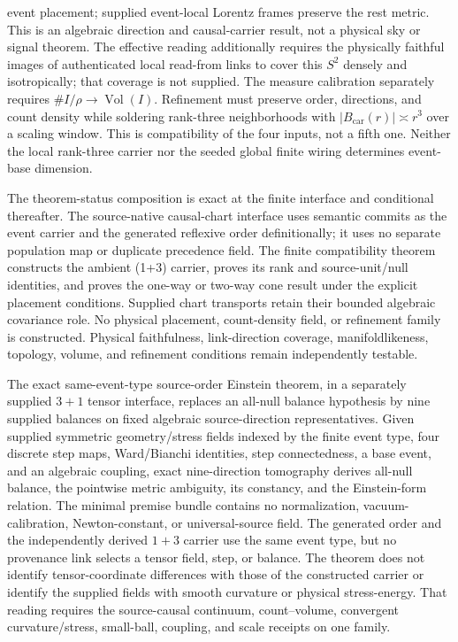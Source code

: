 event placement;
supplied event-local Lorentz frames preserve the rest metric. This is an
algebraic direction and causal-carrier result, not a physical sky or
signal theorem. The effective reading additionally requires the physically
faithful images of authenticated local read-from links to cover this \(S^2\)
densely and isotropically; that coverage is not supplied. The measure calibration separately
requires \(\#I/\rho\to\operatorname{Vol}(I)\). Refinement must preserve order,
directions, and count density while soldering rank-three neighborhoods with
\(\lvert B_{\mathrm{car}}(r)\rvert\asymp r^3\) over a scaling window. This is
compatibility of the four inputs, not a fifth one. Neither the local rank-three
carrier nor the seeded global finite wiring determines event-base dimension.

The theorem-status composition is exact at the finite interface and
conditional thereafter. The source-native causal-chart interface uses semantic
commits as the event carrier and the generated reflexive order definitionally;
it uses no separate population map or duplicate precedence field. The finite
compatibility theorem constructs the ambient (1+3) carrier, proves its rank
and source-unit/null identities, and proves the one-way or two-way cone result
under the explicit placement conditions. Supplied chart transports retain
their bounded algebraic covariance role. No physical placement, count-density
field, or refinement family is constructed. Physical faithfulness,
link-direction coverage, manifoldlikeness, topology, volume, and refinement
conditions remain independently testable.

The exact same-event-type source-order Einstein theorem, in a separately
supplied \(3+1\) tensor interface, replaces an all-null
balance hypothesis by nine supplied balances on fixed algebraic
source-direction representatives. Given supplied symmetric geometry/stress
fields indexed by the finite event type, four discrete step maps, Ward/Bianchi
identities, step connectedness, a base event, and an algebraic coupling, exact
nine-direction tomography derives all-null balance, the pointwise metric
ambiguity, its constancy, and the Einstein-form relation. The minimal premise
bundle contains no normalization, vacuum-calibration, Newton-constant, or
universal-source field. The generated order and the independently derived \(1+3\) carrier use
the same event type, but no provenance link selects a tensor field, step, or
balance. The theorem does not identify tensor-coordinate differences with
those of the constructed carrier or identify the supplied fields with smooth
curvature or physical stress-energy. That reading requires the source-causal
continuum, count--volume, convergent curvature/stress, small-ball, coupling,
and scale receipts on one family.

